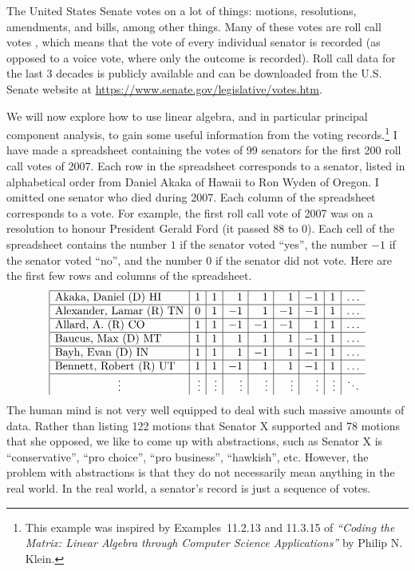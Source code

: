 The United States Senate%
%
%
 votes on a lot of things: motions,
resolutions, amendments, and bills, among other things. Many of these
votes are roll call votes%
%
, which means that the vote of every individual
senator is recorded (as opposed to a voice vote, where only the
outcome is recorded). Roll call data for the last 3 decades is
publicly available and can be downloaded from the U.S. Senate website
at \url{https://www.senate.gov/legislative/votes.htm}.

We will now explore how to use linear algebra, and in particular
principal component analysis, to gain some useful information from the
voting records.\footnote{This example was inspired by Examples~11.2.13
  and 11.3.15 of {\em ``Coding the Matrix: Linear Algebra through
    Computer Science Applications''} by Philip N. Klein.} I have made
a spreadsheet containing the votes of 99 senators for the first 200
roll call votes of 2007. Each row in the spreadsheet corresponds to a
senator, listed in alphabetical order from Daniel Akaka of Hawaii to
Ron Wyden of Oregon. I omitted one senator who died during 2007. Each
column of the spreadsheet corresponds to a vote. For example, the
first roll call vote of 2007 was on a resolution to honour President
Gerald Ford (it passed 88 to 0). Each cell of the spreadsheet contains
the number $1$ if the senator voted ``yes'', the number $-1$ if the
senator voted ``no'', and the number $0$ if the senator did not
vote. Here are the first few rows and columns of the spreadsheet.
\begin{equation*}
  \begin{array}{|l|r|r|r|r|r|r|r|r}
    \hline
    \mbox{Akaka, Daniel (D) HI} & 1 & 1 & 1 & 1 & 1 & -1 & 1 & \ldots \\\hline
    \mbox{Alexander, Lamar (R) TN} & 0 & 1 & -1 & 1 & -1 & -1 & 1 & \ldots \\\hline
    \mbox{Allard, A. (R) CO} & 1 & 1 & -1 & -1 & -1 & 1 & 1 & \ldots \\\hline
    \mbox{Baucus, Max (D) MT} & 1 & 1 & 1 & 1 & 1 & -1 & 1 & \ldots \\\hline
    \mbox{Bayh, Evan (D) IN} & 1 & 1 & 1 & -1 & 1 & -1 & 1 & \ldots \\\hline
    \mbox{Bennett, Robert (R) UT} & 1 & 1 & -1 & 1 & 1 & -1 & 1 & \ldots \\\hline
    \multicolumn{1}{|c|}{\vdots} & \vdots & \vdots & \vdots & \vdots & \vdots & \vdots & \vdots & \ddots
  \end{array}
\end{equation*}
The human mind is not very well equipped to deal with such massive
amounts of data. Rather than listing 122 motions that Senator X
supported and 78 motions that she opposed, we like to come up with
abstractions, such as Senator X is ``conservative'', ``pro choice'',
``pro business'', ``hawkish'', etc. However, the problem with
abstractions is that they do not necessarily mean anything in the real
world. In the real world, a senator's record is just a sequence of
votes.

